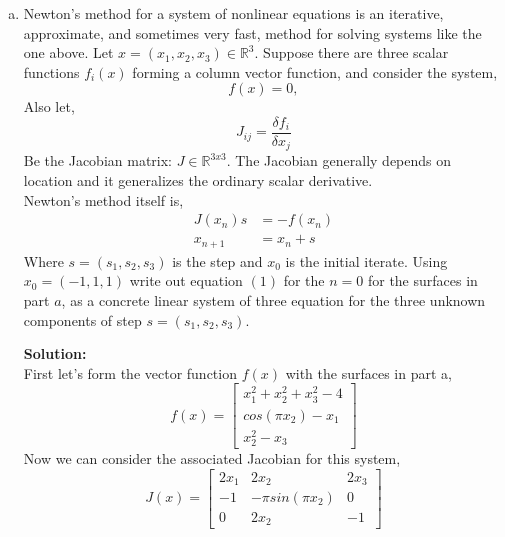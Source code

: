 \documentclass[12pt]{article}
\makeatletter
\theoremstyle{homework}
\newenvironment{exercise}[1]
{\def\@currentlabel{#1}\exercisecore}
{\endexercisecore}
\newcommand{\localhead}[1]{\par\smallskip\noindent\textbf{#1}\nobreak\\}%
\newcommand\solution{\localhead{Solution:}}
\newcommand{\Reals}{\ensuremath{\mathbb R}}
\let\RR\Reals
\makeatother
\begin{document}
\begin{exercise}{P5}
\begin{enumerate}[a.]
    \item Newton's method for a system of nonlinear equations is an iterative, approximate, and sometimes very fast, method for solving systems like the one above. Let $x =(x_1, x_2,x_3) \in \RR^3$.
          Suppose there are three scalar functions $f_i(x)$ forming a column vector function, and consider the system,
          \begin{equation*}
            f(x) = 0,
          \end{equation*}
          Also let,
          \begin{equation*}
            J_{ij} = \dfrac{\delta f_i}{\delta x_j}
          \end{equation*}
          Be the Jacobian matrix: $J \in \RR^{3x3}$. The Jacobian generally depends on location and it generalizes the ordinary scalar derivative.\\
          Newton's method itself is,
          \begin{align}
            J(x_n)s & = -f(x_n) \\
            x_{n+1} & = x_n + s
          \end{align}
          Where $s = (s_1, s_2, s_3)$ is the step and $x_0$ is the initial iterate. Using $x_0 = (-1,1,1)$ write out equation $(1)$ for the $n = 0$ for the surfaces in part $a$,
          as a concrete linear system  of three equation for the three unknown components of step $s = (s_1,s_2,s_3)$. \\
          \solution First let's form the vector function $f(x)$ with the surfaces in part a,
          \begin{equation*}
            f(x) =
            \begin{bmatrix}
              x_1^2 +x_2^2 + x_3^2 - 4 \\
              cos(\pi x_2) -x_1        \\
              x_2^2 - x_3
            \end{bmatrix}
          \end{equation*}
          Now we can consider the associated Jacobian for this system,
          \begin{equation*}
            J(x) = \begin{bmatrix}
              2x_1 & 2x_2              & 2x_3 \\
              -1   & -\pi sin(\pi x_2) & 0    \\
              0    & 2x_2              & -1
            \end{bmatrix}
          \end{equation*}

\end{enumerate}
\end{exercise}
\end{document}
